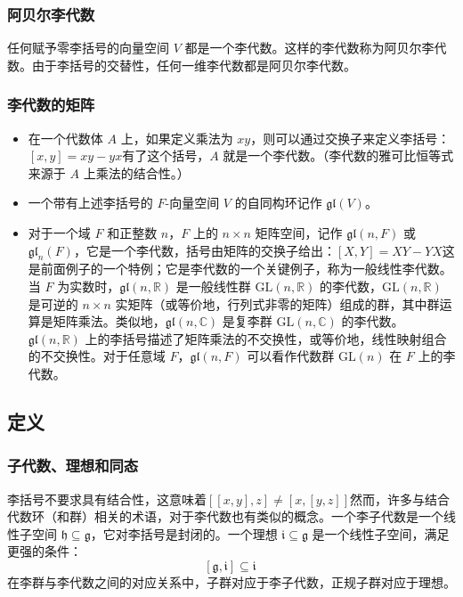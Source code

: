 \subsubsection{阿贝尔李代数}  
任何赋予零李括号的向量空间 \( V \) 都是一个李代数。这样的李代数称为阿贝尔李代数。由于李括号的交替性，任何一维李代数都是阿贝尔李代数。
\subsubsection{李代数的矩阵}  
\begin{itemize}
\item 在一个代数体 \( A \) 上，如果定义乘法为 \( xy \)，则可以通过交换子来定义李括号：  \([x, y] = xy - yx\)有了这个括号，\( A \) 就是一个李代数。（李代数的雅可比恒等式来源于 \( A \) 上乘法的结合性。）  
\item 一个带有上述李括号的 \( F \)-向量空间 \( V \) 的自同构环记作 \( \mathfrak{gl}(V) \)。  
\item 对于一个域 \( F \) 和正整数 \( n \)，\( F \) 上的 \( n \times n \) 矩阵空间，记作 \( \mathfrak{gl}(n,F) \) 或 \( \mathfrak{gl}_n(F) \)，它是一个李代数，括号由矩阵的交换子给出：\([X, Y] = XY - YX\)这是前面例子的一个特例；它是李代数的一个关键例子，称为一般线性李代数。  
当 \( F \) 为实数时，\( \mathfrak{gl}(n, \mathbb{R}) \) 是一般线性群 \( \mathrm{GL}(n, \mathbb{R}) \) 的李代数，\( \mathrm{GL}(n, \mathbb{R}) \) 是可逆的 \( n \times n \) 实矩阵（或等价地，行列式非零的矩阵）组成的群，其中群运算是矩阵乘法。类似地，\( \mathfrak{gl}(n, \mathbb{C}) \) 是复李群 \( \mathrm{GL}(n, \mathbb{C}) \) 的李代数。  
\( \mathfrak{gl}(n, \mathbb{R}) \) 上的李括号描述了矩阵乘法的不交换性，或等价地，线性映射组合的不交换性。对于任意域 \( F \)，\( \mathfrak{gl}(n, F) \) 可以看作代数群 \( \mathrm{GL}(n) \) 在 \( F \) 上的李代数。
\end{itemize}
\subsection{定义}  
\subsubsection{子代数、理想和同态} 
李括号不要求具有结合性，这意味着\([[x,y],z] \neq [x,[y,z]]\)然而，许多与结合代数环（和群）相关的术语，对于李代数也有类似的概念。一个李子代数是一个线性子空间 \( \mathfrak{h} \subseteq \mathfrak{g} \)，它对李括号是封闭的。一个理想 \( \mathfrak{i} \subseteq \mathfrak{g} \) 是一个线性子空间，满足更强的条件：  
\[
[\mathfrak{g}, \mathfrak{i}] \subseteq \mathfrak{i}~
\]  
在李群与李代数之间的对应关系中，子群对应于李子代数，正规子群对应于理想。  

